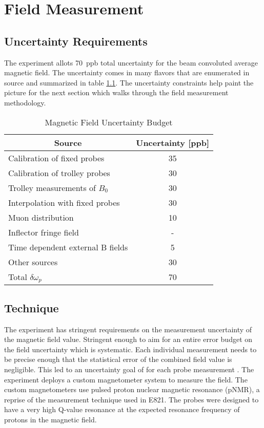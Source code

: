 \chapter{Field Measurement} \label{ch:field-meaurement}

\section{Uncertainty Requirements}

The \mugmtwo experiment allots \SI{70}{ppb} total uncertainty for the beam convoluted average magnetic field.  The uncertainty comes in many flavors that are enumerated in source \cite{e989-tdr} and summarized in table \ref{tab:field-uncertainties}.  The uncertainty constraints help paint the picture for the next section which walks through the field measurement methodology.

\begin{table}[h]
\label{tab:field-uncertainties}
\caption{Magnetic Field Uncertainty Budget}
\centering
\begin{tabular}{l c}
    \hline
    \multicolumn{1}{c}{Source} & Uncertainty [ppb] \\
    \hline
    Calibration of fixed probes   & 35 \\
    Calibration of trolley probes    & 30 \\
    Trolley measurements of $B_0$    & 30 \\
    Interpolation with fixed probes  & 30 \\
    Muon distribution                & 10 \\
    Inflector fringe field           & -  \\
    Time dependent external B fields & 5  \\
    Other sources                    & 30 \\
    \hline
    Total $\delta \omega_p$          & 70 \\
    \hline
\end{tabular}
\end{table}

\section{Technique} \label{sec:field-measurement-technique}

The \gmtwo experiment has stringent requirements on the measurement uncertainty of the magnetic field value.  Stringent enough to aim for an entire error budget on the field uncertainty which is systematic.  Each individual measurement needs to be precise enough that the statistical error of the combined field value is negligible.  This led to an uncertainty goal of  for each probe measurement .  The experiment deploys a custom magnetometer system to measure the field.  The custom magnetometers use pulsed proton nuclear magnetic resonance (pNMR), a reprise of the measurement technique used in E821.  The probes were designed to have a very high Q-value resonance at the expected resonance frequency of protons in the magnetic field.

